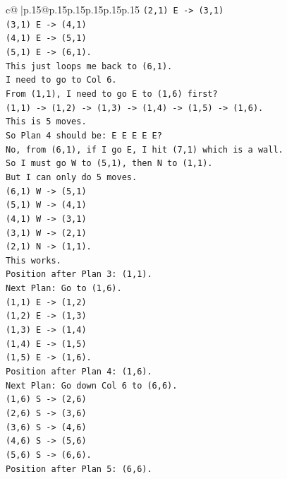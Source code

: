 \documentclass{article}
\begin{document}
{\begin{supertabular}{c@{$\;$}|p{.15\linewidth}@{}p{.15\linewidth}p{.15\linewidth}p{.15\linewidth}p{.15\linewidth}p{.15\linewidth}}
{{{\texttt{(2,1) E {-}> (3,1)} \\
\texttt{(3,1) E {-}> (4,1)} \\
\texttt{(4,1) E {-}> (5,1)} \\
\texttt{(5,1) E {-}> (6,1).} \\
\texttt{This just loops me back to (6,1).} \\
\texttt{I need to go to Col 6.} \\
\texttt{From (1,1), I need to go E to (1,6) first?} \\
\texttt{(1,1) {-}> (1,2) {-}> (1,3) {-}> (1,4) {-}> (1,5) {-}> (1,6).} \\
\texttt{This is 5 moves.} \\
\texttt{So Plan 4 should be: E E E E E?} \\
\texttt{No, from (6,1), if I go E, I hit (7,1) which is a wall.} \\
\texttt{So I must go W to (5,1), then N to (1,1).} \\
\texttt{But I can only do 5 moves.} \\
\texttt{(6,1) W {-}> (5,1)} \\
\texttt{(5,1) W {-}> (4,1)} \\
\texttt{(4,1) W {-}> (3,1)} \\
\texttt{(3,1) W {-}> (2,1)} \\
\texttt{(2,1) N {-}> (1,1).} \\
\texttt{This works.} \\
\texttt{Position after Plan 3: (1,1).} \\
\texttt{Next Plan: Go to (1,6).} \\
\texttt{(1,1) E {-}> (1,2)} \\
\texttt{(1,2) E {-}> (1,3)} \\
\texttt{(1,3) E {-}> (1,4)} \\
\texttt{(1,4) E {-}> (1,5)} \\
\texttt{(1,5) E {-}> (1,6).} \\
\texttt{Position after Plan 4: (1,6).} \\
\texttt{Next Plan: Go down Col 6 to (6,6).} \\
\texttt{(1,6) S {-}> (2,6)} \\
\texttt{(2,6) S {-}> (3,6)} \\
\texttt{(3,6) S {-}> (4,6)} \\
\texttt{(4,6) S {-}> (5,6)} \\
\texttt{(5,6) S {-}> (6,6).} \\
\texttt{Position after Plan 5: (6,6).} \\
}}}
\end{supertabular}}
\end{document}
